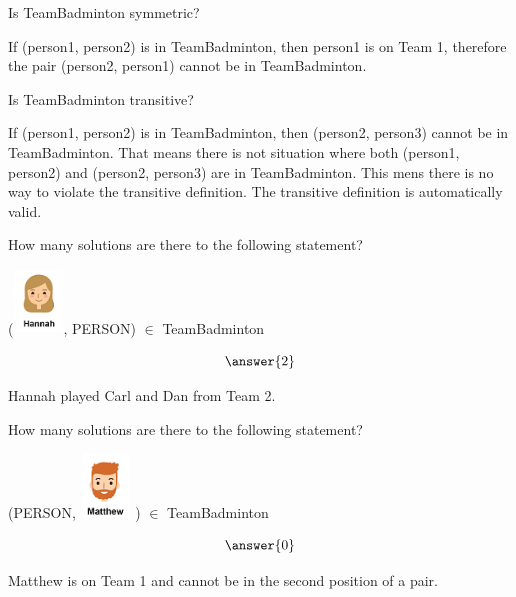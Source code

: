 \documentclass{ximera}
\begin{document}
\begin{exercise}
Is TeamBadminton symmetric?

  \begin{multipleChoice}
  \end{multipleChoice}
  \begin{feedback}
  If (person1, person2) is in TeamBadminton, then person1 is on Team 1, therefore the pair (person2, person1) cannot be in TeamBadminton.
  \end{feedback}
\end{exercise}





\begin{exercise}
Is TeamBadminton transitive?

  \begin{multipleChoice}
  \end{multipleChoice}
  \begin{feedback}
If (person1, person2) is in TeamBadminton, then (person2, person3) cannot be in TeamBadminton.  That means there is not situation where both (person1, person2) and (person2, person3) are in TeamBadminton.  This mens there is no way to violate the transitive definition.  The transitive definition is automatically valid.
  \end{feedback}
\end{exercise}




\begin{exercise}
How many solutions are there to the following statement?  

({\includegraphics[width=50px,height=65px]{pics/people/hannah.png}}, PERSON) $\in$ TeamBadminton 

\[  \answer{2} \]

  \begin{feedback}
Hannah played Carl and Dan from Team 2.
  \end{feedback}
\end{exercise}





\begin{exercise}
How many solutions are there to the following statement?  

(PERSON, {\includegraphics[width=50px,height=65px]{pics/people/Matthew.png}} ) $\in$ TeamBadminton 

\[  \answer{0} \]

  \begin{feedback}
Matthew is on Team 1 and cannot be in the second position of a pair.
  \end{feedback}
\end{exercise}
\end{document}
